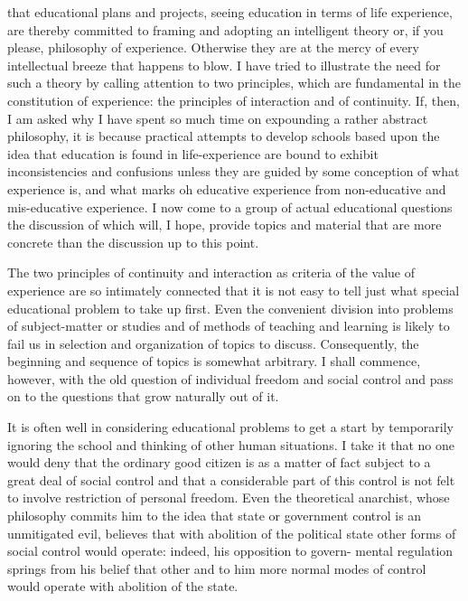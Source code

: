 
 that educational plans and projects, seeing education in terms of life 
experience, are thereby committed to framing and adopting an intelligent theory or, if you 
please, philosophy of experience. Otherwise they are at the mercy of every intellectual 
breeze that happens to blow. I have tried to illustrate the need for such a theory by calling 
attention to two principles, which are fundamental in the constitution of experience: the 
principles of interaction and of continuity. If, then, I am asked why I have spent so much 
time on expounding a rather abstract philosophy, it is because practical attempts to 
develop schools based upon the idea that education is found in life-experience are bound 
to exhibit inconsistencies and confusions unless they are guided by some conception of 
what experience is, and what marks oh educative experience from non-educative and 
mis-educative experience. I now come to a group of actual educational questions the 
discussion of which will, I hope, provide topics and material that are more concrete than 
the discussion up to this point. 

The two principles of continuity and interaction as criteria of the value of experience 
are so intimately connected that it is not easy to tell just what special educational problem 
to take up first. Even the convenient division into problems of subject-matter or studies 
and of methods of teaching and learning is likely to fail us in selection and organization 
of topics to discuss. Consequently, the beginning and sequence of topics is somewhat 
arbitrary. I shall commence, however, with the old question of individual freedom and 
social control and pass on to the questions that grow naturally out of it. 

It is often well in considering educational problems to get a start by temporarily 
ignoring the school and thinking of other human situations. I take it that no one would 
deny that the ordinary good citizen is as a matter of fact subject to a great deal of social 
control and that a considerable part of this control is not felt to involve restriction of 
personal freedom. Even the theoretical anarchist, whose philosophy commits him to the 
idea that state or government control is an unmitigated evil, believes that with abolition 
of the political state other forms of social control would operate: indeed, his opposition to 
govern- mental regulation springs from his belief that other and to him more normal 
modes of control would operate with abolition of the state. 


